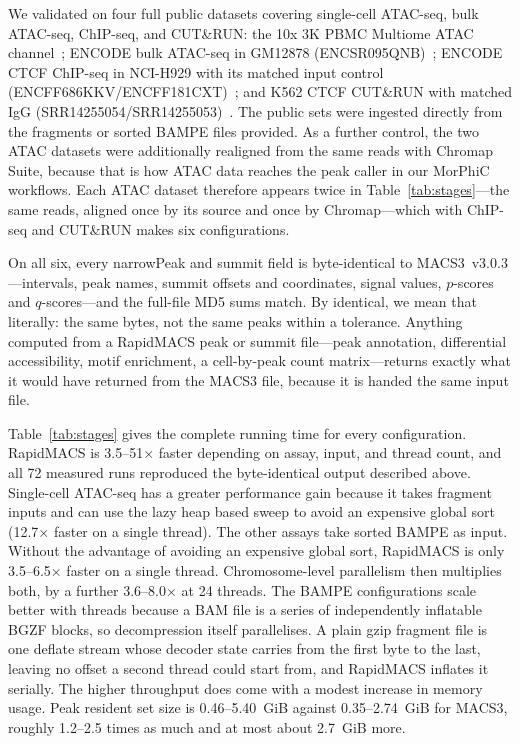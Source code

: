 \documentclass[namedate,webpdf,contemporary,large]{oup-authoring-template}
\begin{document}
We validated on four full public datasets covering single-cell ATAC-seq, bulk ATAC-seq, ChIP-seq, and CUT\&RUN: the 10x 3K PBMC Multiome ATAC channel~\citep{tenx_pbmc3k_multiome}; ENCODE bulk ATAC-seq in GM12878 (ENCSR095QNB)~\citep{encode_atac_gm12878}; ENCODE CTCF ChIP-seq in NCI-H929 with its matched input control (ENCFF686KKV/\allowbreak ENCFF181CXT)~\citep{encode_ctcf_h929}; and K562 CTCF CUT\&RUN with matched IgG (SRR14255054/\allowbreak SRR14255053)~\citep{ng_mynrl15_cutrun}. The public sets were ingested directly from the fragments or sorted BAMPE files provided. As a further control, the two ATAC datasets were additionally realigned from the same reads with Chromap Suite, because that is how ATAC data reaches the peak caller in our MorPhiC workflows. Each ATAC dataset therefore appears twice in Table~\ref{tab:stages}---the same reads, aligned once by its source and once by Chromap---which with ChIP-seq and CUT\&RUN makes six configurations.

On all six, every narrowPeak and summit field is byte-identical to MACS3~v3.0.3---intervals, peak names, summit offsets and coordinates, signal values, $p$-scores and $q$-scores---and the full-file MD5 sums match. By identical, we mean that literally:
the same bytes, not the same peaks within a tolerance. Anything computed from a RapidMACS peak or summit file---peak annotation, differential accessibility, motif enrichment, a cell-by-peak count matrix---returns exactly what it would have returned from the MACS3 file, because it is handed the same input file.

Table~\ref{tab:stages} gives the complete running time for every configuration. RapidMACS is 3.5--51$\times$ faster depending on assay, input, and thread count, and all 72 measured runs reproduced the byte-identical output described above. Single-cell ATAC-seq has a greater performance gain because it takes fragment inputs and can use the lazy heap based sweep to avoid an expensive global sort (12.7$\times$ faster on a single thread). The other assays take sorted BAMPE as input. Without the advantage of avoiding an expensive global sort, RapidMACS is only 3.5--6.5$\times$ faster on a single thread. Chromosome-level parallelism then multiplies both, by a further 3.6--8.0$\times$ at 24 threads. The BAMPE configurations scale better with threads because a BAM file is a series of independently inflatable BGZF blocks, so decompression itself parallelises. A plain gzip fragment file is one deflate stream whose decoder state carries from the first byte to the last, leaving no offset a second thread could start from, and RapidMACS inflates it serially. The higher throughput does come with a modest increase in memory usage. Peak resident set size is 0.46--5.40~GiB against 0.35--2.74~GiB for MACS3, roughly 1.2--2.5 times as much and at most about 2.7~GiB more.
\end{document}
